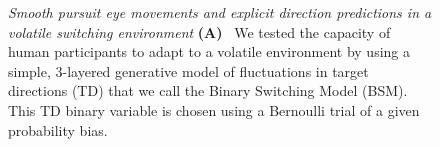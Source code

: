\documentclass[12pt,english]{article}%
\begin{document}
\begin{figure}%
\caption{
\emph{Smooth pursuit eye movements and explicit direction predictions in a volatile switching environment}
\textbf{(A)}~
We tested the capacity of human participants to adapt to a volatile environment
by using a simple, 3-layered generative model of fluctuations in target directions (TD)
that we call the Binary Switching Model (BSM).
This TD binary variable is chosen using a Bernoulli trial of a given probability bias.
}
\end{figure}
\end{document}
